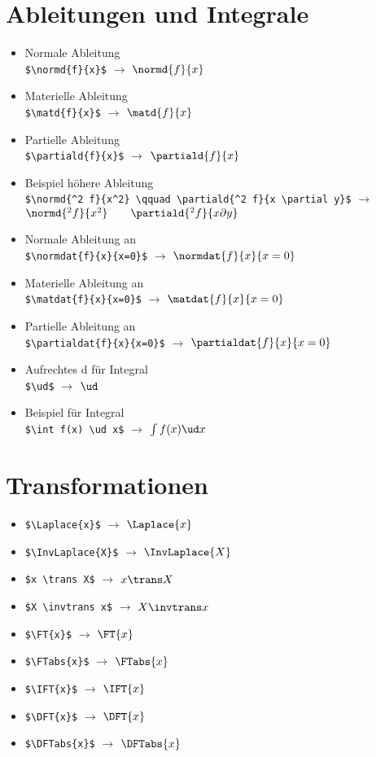 \section*{Ableitungen und Integrale}
\begin{itemize}
	\item Normale Ableitung\\ \verb|$\normd{f}{x}$| $\rightarrow$ $\normd{f}{x}$
	\item Materielle Ableitung\\ \verb|$\matd{f}{x}$| $\rightarrow$ $\matd{f}{x}$
	\item Partielle Ableitung\\ \verb|$\partiald{f}{x}$| $\rightarrow$ $\partiald{f}{x}$
	\item Beispiel höhere Ableitung\\ \verb|$\normd{^2 f}{x^2} \qquad \partiald{^2 f}{x \partial y}$| $\rightarrow$ $\normd{^2 f}{x^2} \qquad \partiald{^2 f}{x \partial y}$
	\item Normale Ableitung an\\ \verb|$\normdat{f}{x}{x=0}$| $\rightarrow$ $\normdat{f}{x}{x=0}$
	\item Materielle Ableitung an\\ \verb|$\matdat{f}{x}{x=0}$| $\rightarrow$ $\matdat{f}{x}{x=0}$
	\item Partielle Ableitung an\\ \verb|$\partialdat{f}{x}{x=0}$| $\rightarrow$ $\partialdat{f}{x}{x=0}$
	\item Aufrechtes \glqq{}d\grqq{} für Integral\\ \verb|$\ud$| $\rightarrow$ $\ud$
	\item Beispiel für Integral\\ \verb|$\int f(x) \ud x$| $\rightarrow$ $\int f(x) \ud x$
\end{itemize}


\section*{Transformationen}
\begin{itemize}
	\item \verb|$\Laplace{x}$| $\rightarrow$ $\Laplace{x}$
	\item \verb|$\InvLaplace{X}$| $\rightarrow$ $\InvLaplace{X}$
	\item \verb|$x \trans X$| $\rightarrow$ $x \trans X$
	\item \verb|$X \invtrans x$| $\rightarrow$ $X \invtrans x$
	\item \verb|$\FT{x}$| $\rightarrow$ $\FT{x}$
	\item \verb|$\FTabs{x}$| $\rightarrow$ $\FTabs{x}$
	\item \verb|$\IFT{x}$| $\rightarrow$ $\IFT{x}$
	\item \verb|$\DFT{x}$| $\rightarrow$ $\DFT{x}$
	\item \verb|$\DFTabs{x}$| $\rightarrow$ $\DFTabs{x}$
\end{itemize}




